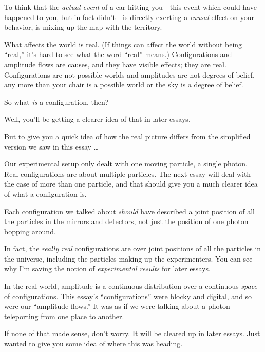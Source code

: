 {
 To think that the \textit{actual event} of a car hitting
you---this event which could have happened to you, but in fact
didn't---is directly exerting a \textit{causal} effect
on your behavior, is mixing up the map with the territory.}

{
 What affects the world is real. (If things can affect the world
without being ``real,''
it's hard to see what the word
``real'' means.) Configurations and
amplitude flows are causes, and they have visible effects; they are
real. Configurations are not possible worlds and amplitudes are not
degrees of belief, any more than your chair is a possible world or the
sky is a degree of belief.}

{
 So what \textit{is} a configuration, then?}

{
 Well, you'll be getting a clearer idea of that in
later essays.}

{
 But to give you a quick idea of how the real picture differs from
the simplified version we saw in this essay \ldots}

{
 Our experimental setup only dealt with one moving particle, a
single photon. Real configurations are about multiple particles. The
next essay will deal with the case of more than one particle, and that
should give you a much clearer idea of what a configuration is.}

{
 Each configuration we talked about \textit{should} have described
a joint position of all the particles in the mirrors and detectors, not
just the position of one photon bopping around.}

{
 In fact, the \textit{really real} configurations are over joint
positions of all the particles in the universe, including the particles
making up the experimenters. You can see why I'm saving
the notion of \textit{experimental results} for later essays.}

{
 In the real world, amplitude is a continuous distribution over a
continuous \textit{space} of configurations. This
essay's
``configurations'' were blocky and
digital, and so were our ``amplitude
flows.'' It was as if we were talking about a photon
teleporting from one place to another.}

{
 If none of that made sense, don't worry. It will
be cleared up in later essays. Just wanted to give you some idea of
where this was heading.}

\myendsectiontext


\bigskip



